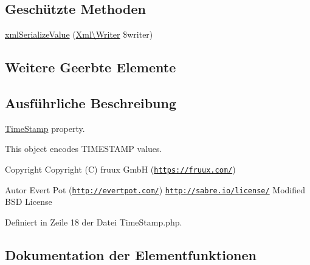 \subsection*{Geschützte Methoden}
\begin{DoxyCompactItemize}
\item 
\mbox{\hyperlink{class_sabre_1_1_v_object_1_1_property_1_1_v_card_1_1_time_stamp_a6bd779f7b61846ec13916096d6a76c6c}{xml\+Serialize\+Value}} (\mbox{\hyperlink{class_sabre_1_1_xml_1_1_writer}{Xml\textbackslash{}\+Writer}} \$writer)
\end{DoxyCompactItemize}
\subsection*{Weitere Geerbte Elemente}


\subsection{Ausführliche Beschreibung}
\mbox{\hyperlink{class_sabre_1_1_v_object_1_1_property_1_1_v_card_1_1_time_stamp}{Time\+Stamp}} property.

This object encodes T\+I\+M\+E\+S\+T\+A\+MP values.

\begin{DoxyCopyright}{Copyright}
Copyright (C) fruux GmbH (\href{https://fruux.com/}{\tt https\+://fruux.\+com/}) 
\end{DoxyCopyright}
\begin{DoxyAuthor}{Autor}
Evert Pot (\href{http://evertpot.com/}{\tt http\+://evertpot.\+com/})  \href{http://sabre.io/license/}{\tt http\+://sabre.\+io/license/} Modified B\+SD License 
\end{DoxyAuthor}


Definiert in Zeile 18 der Datei Time\+Stamp.\+php.



\subsection{Dokumentation der Elementfunktionen}
\mbox{\label{class_sabre_1_1_v_object_1_1_property_1_1_v_card_1_1_time_stamp_a6dc1cd36f265d29ac502e7e87c056a54}} 

